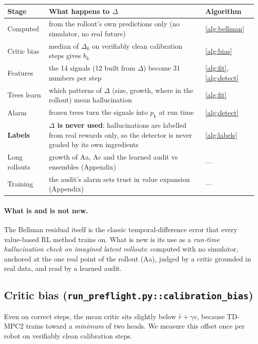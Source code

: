 \documentclass[11pt]{article}
\newcommand{\code}[1]{\texttt{#1}}
\begin{document}
\begin{center}
\renewcommand{\arraystretch}{1.3}
\begin{tabular}{@{}p{3.4cm}p{8.2cm}l@{}}
\toprule
Stage & What happens to $\Delta$ & Algorithm\\
\midrule
Computed & from the rollout's own predictions only (no simulator, no real future) & \ref{alg:bellman}\\
Critic bias & median of $\Delta_k$ on verifiably clean calibration steps gives $b_k$ & \ref{alg:bias}\\
Features & the 14 signals (12 built from $\Delta$) become 31 numbers per step & \ref{alg:fit}, \ref{alg:detect}\\
Trees learn & which patterns of $\Delta$ (size, growth, where in the rollout) mean hallucination & \ref{alg:fit}\\
Alarm & frozen trees turn the signals into $p_k$ at run time & \ref{alg:detect}\\
\textbf{Labels} & \textbf{$\Delta$ is never used}: hallucinations are labelled from real rewards only, so the
detector is never graded by its own ingredients & \ref{alg:labels}\\
Long rollouts & growth of Aa, Ac and the learned audit vs ensembles (Appendix) & ---\\
Training & the audit's alarm sets trust in value expansion (Appendix) & ---\\
\bottomrule
\end{tabular}
\end{center}

\paragraph{What is and is not new.} The Bellman residual itself is the classic temporal-difference error that every
value-based RL method trains on. What is new is its use as a \emph{run-time hallucination check on imagined latent
rollouts}: computed with no simulator, anchored at the one real point of the rollout (Aa), judged by a critic
grounded in real data, and read by a learned audit.

\subsection{Critic bias (\code{run\_preflight.py::calibration\_bias})}\label{sec:bias}

Even on correct steps, the mean critic sits slightly below $\hat r+\gamma v$, because TD-MPC2 trains toward a
\emph{minimum} of two heads. We measure this offset once per robot on verifiably clean calibration steps.
\end{document}
